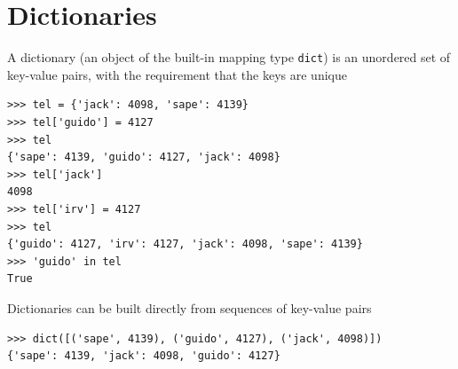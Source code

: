 \documentclass[8pt,a4paper,compress]{beamer}
\begin{document}
\section{Dictionaries}
\begin{frame}[fragile]
\pause

A dictionary (an object of the built-in mapping type \lstinline{dict}) is an unordered set of key-value pairs, with the requirement that the keys are unique

\smallskip

\begin{lstlisting}[language={},style=focusin]
>>> tel = {'jack': 4098, 'sape': 4139}
>>> tel['guido'] = 4127
>>> tel
{'sape': 4139, 'guido': 4127, 'jack': 4098}
>>> tel['jack']
4098
>>> tel['irv'] = 4127
>>> tel
{'guido': 4127, 'irv': 4127, 'jack': 4098, 'sape': 4139}
>>> 'guido' in tel
True
\end{lstlisting}

\pause\bigskip

Dictionaries can be built directly from sequences of key-value pairs

\smallskip

\begin{lstlisting}[language={},style=focusin]
>>> dict([('sape', 4139), ('guido', 4127), ('jack', 4098)])
{'sape': 4139, 'jack': 4098, 'guido': 4127}
\end{lstlisting}
\end{frame}
\end{document}
